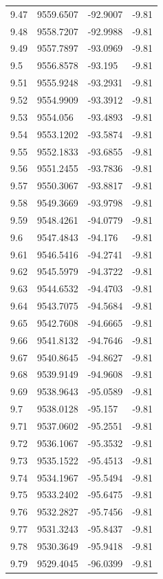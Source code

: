 \begin{table}[H]
\begin{tabular}{llll}
9.47 & 9559.6507 & -92.9007 & -9.81 \\
9.48 & 9558.7207 & -92.9988 & -9.81 \\
9.49 & 9557.7897 & -93.0969 & -9.81 \\
9.5 & 9556.8578 & -93.195 & -9.81 \\
9.51 & 9555.9248 & -93.2931 & -9.81 \\
9.52 & 9554.9909 & -93.3912 & -9.81 \\
9.53 & 9554.056 & -93.4893 & -9.81 \\
9.54 & 9553.1202 & -93.5874 & -9.81 \\
9.55 & 9552.1833 & -93.6855 & -9.81 \\
9.56 & 9551.2455 & -93.7836 & -9.81 \\
9.57 & 9550.3067 & -93.8817 & -9.81 \\
9.58 & 9549.3669 & -93.9798 & -9.81 \\
9.59 & 9548.4261 & -94.0779 & -9.81 \\
9.6 & 9547.4843 & -94.176 & -9.81 \\
9.61 & 9546.5416 & -94.2741 & -9.81 \\
9.62 & 9545.5979 & -94.3722 & -9.81 \\
9.63 & 9544.6532 & -94.4703 & -9.81 \\
9.64 & 9543.7075 & -94.5684 & -9.81 \\
9.65 & 9542.7608 & -94.6665 & -9.81 \\
9.66 & 9541.8132 & -94.7646 & -9.81 \\
9.67 & 9540.8645 & -94.8627 & -9.81 \\
9.68 & 9539.9149 & -94.9608 & -9.81 \\
9.69 & 9538.9643 & -95.0589 & -9.81 \\
9.7 & 9538.0128 & -95.157 & -9.81 \\
9.71 & 9537.0602 & -95.2551 & -9.81 \\
9.72 & 9536.1067 & -95.3532 & -9.81 \\
9.73 & 9535.1522 & -95.4513 & -9.81 \\
9.74 & 9534.1967 & -95.5494 & -9.81 \\
9.75 & 9533.2402 & -95.6475 & -9.81 \\
9.76 & 9532.2827 & -95.7456 & -9.81 \\
9.77 & 9531.3243 & -95.8437 & -9.81 \\
9.78 & 9530.3649 & -95.9418 & -9.81 \\
9.79 & 9529.4045 & -96.0399 & -9.81 \\

\end{tabular}
\end{table}
